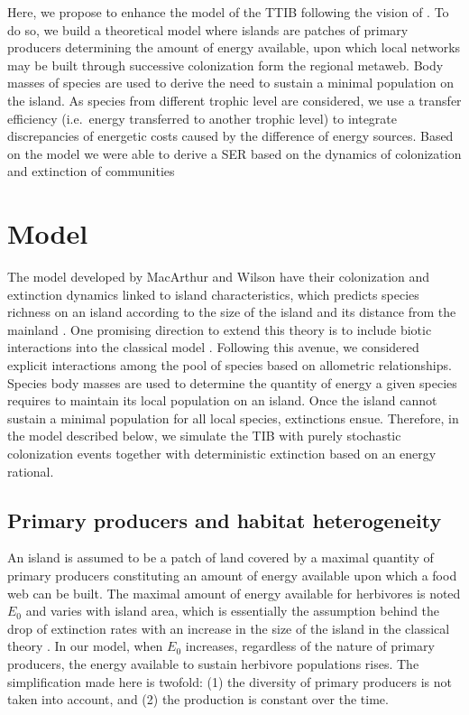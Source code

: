 Here, we propose to enhance the model of the TTIB following the vision
of \citet{Wright1983}. To do so, we build a theoretical model where
islands are patches of primary producers determining the amount of
energy available, upon which local networks may be built through
successive colonization form the regional metaweb. Body masses of
species are used to derive the need to sustain a minimal population on
the island. As species from different trophic level are considered, we
use a transfer efficiency (i.e.~energy transferred to another trophic
level) to integrate discrepancies of energetic costs caused by the
difference of energy sources. Based on the model we were able to derive
a SER based on the dynamics of colonization and extinction of
communities

\section{Model}\label{model}

The model developed by MacArthur and Wilson have their colonization and
extinction dynamics linked to island characteristics, which predicts
species richness on an island according to the size of the island and
its distance from the mainland \citep{MacArthur1967}. One promising
direction to extend this theory is to include biotic interactions into
the classical model \citep{Holt2010, Gravel2011, Cazelles2015a}.
Following this avenue, we considered explicit interactions among the
pool of species based on allometric relationships. Species body masses
are used to determine the quantity of energy a given species requires to
maintain its local population on an island. Once the island cannot
sustain a minimal population for all local species, extinctions ensue.
Therefore, in the model described below, we simulate the TIB with purely
stochastic colonization events together with deterministic extinction
based on an energy rational.

\subsection{Primary producers and habitat
heterogeneity}\label{primary-producers-and-habitat-heterogeneity}

An island is assumed to be a patch of land covered by a maximal quantity
of primary producers constituting an amount of energy available upon
which a food web can be built. The maximal amount of energy available
for herbivores is noted \(E_0\) and varies with island area, which is
essentially the assumption behind the drop of extinction rates with an
increase in the size of the island in the classical theory
\citep{MacArthur1967, Rabosky2015}. In our model, when \(E_0\)
increases, regardless of the nature of primary producers, the energy
available to sustain herbivore populations rises. The simplification
made here is twofold: (1) the diversity of primary producers is not
taken into account, and (2) the production is constant over the time.

